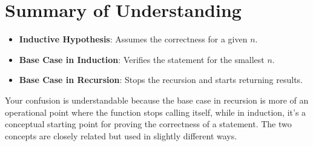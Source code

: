 \documentclass{article}
\begin{document}
\section{Summary of Understanding}

\begin{itemize}
    \item \textbf{Inductive Hypothesis}: Assumes the correctness for a given \( n \).
    \item \textbf{Base Case in Induction}: Verifies the statement for the smallest \( n \).
    \item \textbf{Base Case in Recursion}: Stops the recursion and starts returning results.
\end{itemize}

Your confusion is understandable because the base case in recursion is more of an operational point where the function stops calling itself, while in induction, it's a conceptual starting point for proving the correctness of a statement. The two concepts are closely related but used in slightly different ways.
\end{document}
